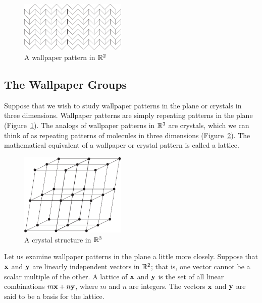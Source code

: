  
\begin{figure}[thb]
\begin{center}
\centerline {
\includegraphics[width=2in]{Wallpaper}
}
\end{center}
\caption{A wallpaper pattern in ${\Bbb R}^2$}
\label{Wallpaper}
\end{figure}
 
 
 
\subsection*{The Wallpaper Groups}
 
 
 
Suppose that we wish to study wallpaper patterns in the plane or
crystals in three dimensions. Wallpaper patterns are simply repeating
patterns in the plane (Figure~\ref{Wallpaper}). The analogs of
wallpaper patterns in ${\Bbb R}^3$ are crystals, which we can think of
as repeating patterns of molecules in three dimensions
(Figure~\ref{Crystals}). The mathematical equivalent of a wallpaper or
crystal pattern is called a  lattice. 
 
 
 
\begin{figure}[hbt]
\begin{center}
\centerline {
\includegraphics[width=2in]{Crystals}
}
\end{center}
\caption{A crystal structure in ${\Bbb R}^3$}
\label{Crystals}
\end{figure}
 
 

Let us examine wallpaper patterns in the plane a
little more closely. Suppose that ${\bold x}$ and ${\bold y}$ are
linearly independent vectors in ${\Bbb R}^2$; that is, one vector
cannot be a scalar multiple of the other. A {\bfi
lattice\/} of ${\bold x}$ and ${\bold y}$ is
the set of all linear combinations $m {\bold x} + n {\bold y}$, where
$m$ and $n$ are integers. The vectors ${\bold x}$ and ${\bold y}$ are
said to be a {\bfi basis\/} for the lattice.
 
